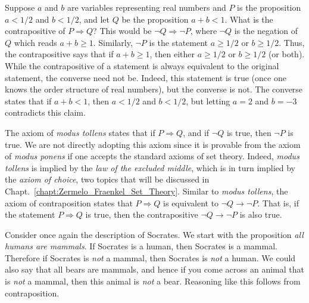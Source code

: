         \begin{example}
            Suppose $a$ and $b$ are variables representing real numbers and $P$
            is the proposition $a<1/2$ and $b<1/2$, and let $Q$ be the
            proposition $a+b<1$. What is the contrapositive of
            $P\Rightarrow{Q}$? This would be $\neg{Q}\Rightarrow\neg{P}$, where
            $\neg{Q}$ is the negation of $Q$ which reads $a+b\geq{1}$.
            Similarly, $\neg{P}$ is the statement $a\geq{1}/2$ or $b\geq{1}/2$.
            Thus, the contrapositive says that if $a+b\geq{1}$, then either
            $a\geq{1}/2$ or $b\geq{1}/2$ (or both). While the contrapositive of
            a statement is always equivalent to the original statement, the
            converse need not be. Indeed, this statement is true (once one knows
            the order structure of real numbers), but the converse is not. The
            converse states that if $a+b<1$, then $a<1/2$ and $b<1/2$, but
            letting $a=2$ and $b=\minus{3}$ contradicts this claim.
        \end{example}
        The axiom of \textit{modus tollens} states that if
        $P\Rightarrow{Q}$, and if $\neg{Q}$ is true, then $\neg{P}$ is true. We
        are not directly adopting this axiom since it is provable from the
        axiom of \textit{modus ponens} if one accepts the standard axioms of set
        theory. Indeed, \textit{modus tollens} is implied by the
        \textit{law of the excluded middle},
        which is in turn implied by the
        \textit{axiom of choice}, two topics that will be
        discussed in Chapt.~\ref{chapt:Zermelo_Fraenkel_Set_Theory}. Similar to
        \textit{modus tollens}, the axiom of contraposition states that
        $P\Rightarrow{Q}$ is equivalent to $\neg{Q}\rightarrow\neg{P}$. That is,
        if the statement $P\Rightarrow{Q}$ is true, then the contrapositive
        $\neg{Q}\rightarrow\neg{P}$ is also true.
        \begin{example}
            Consider once again the description of Socrates. We start with the
            proposition \textit{all humans are mammals}. If Socrates is a human,
            then Socrates is a mammal. Therefore if Socrates is \textit{not} a
            mammal, then Socrates is \textit{not} a human. We could also say
            that all bears are mammals, and hence if you come across an animal
            that is \textit{not} a mammal, then this animal is \textit{not} a
            bear. Reasoning like this follows from contraposition.
        \end{example}
